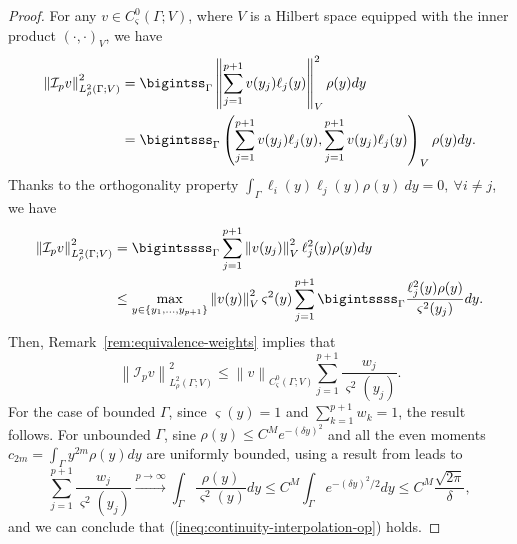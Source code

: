\documentclass[final,onefignum,onetabnum]{mousaviart}
\begin{document}
			\vspace*{1mm}
			\begin{proof}
				For any $v \in C^0_\varsigma\left( \Gamma; V \right)$, where $V$ is a Hilbert space equipped with the inner product $(\cdot, \cdot)_V$, we have
				\begin{align*}
					\left\| \mathcal{I}_p v\right\|_{L_\rho^2(\Gamma; V)}^2 
					&= 
					\bigintss_{\Gamma} \left\| \sum_{j=1}^{p+1} v(y_j) \ell_j(y) \right\|_V^2 \rho(y)dy 
					\\ 
					&=
					\bigintsss_{\Gamma} \left( \sum_{j=1}^{p+1} v(y_j) \ell_j(y), \sum_{j=1}^{p+1} v(y_j) \ell_j(y) \right)_V \rho(y)dy. 
				\end{align*}
				Thanks to the orthogonality property 
				$\int_{\Gamma}\ell_i(y)\ell_j(y)\rho(y)~dy = 0,~ \forall i\neq j$, we have
				\begin{align*}
					\left\| \mathcal{I}_p v\right\|_{L_\rho^2(\Gamma; V)}^2 
					&= 
					\bigintssss_{\Gamma} \sum_{j=1}^{p+1} \left\| v(y_j)\right\|_V^2  \ell_j^2(y) \rho(y)dy
					\\
					&\leq
					\max_{y \in \left\lbrace y_1, \dots, y_{p+1} \right\rbrace} 
					\left\| v(y)\right\|_V^2 \varsigma^2(y)
					\sum_{j=1}^{p+1} \bigintssss_{\Gamma} \frac{\ell_j^2(y) \rho(y)}{\varsigma^2(y_j)}dy.
				\end{align*}
				Then, Remark~\ref{rem:equivalence-weights} implies that
				\begin{equation*}
					\left\| \mathcal{I}_p v\right\|_{L_\rho^2(\Gamma; V)}^2 
					\leq
					\left\| v \right\|_{C_\varsigma^0(\Gamma; V)}
					\sum_{j=1}^{p+1} \dfrac{w_j}{\varsigma^2(y_j)}. 
				\end{equation*}
				For the case of bounded $\Gamma$, since $\varsigma(y)=1$ and $\sum_{k=1}^{p+1} w_k = 1$, the result follows. For unbounded $\Gamma$, sine $\rho(y) \leq  C^M e^{-(\delta y)^2}$ and all the even moments $c_{2m} = \int_{\Gamma}y^{2m} \rho(y)dy$ are uniformly bounded, using a result from \cite{Uspensky} leads to
				\begin{equation*}
					\sum_{j=1}^{p+1} \dfrac{w_j}{\varsigma^2(y_j)}
					\xrightarrow[]{p\rightarrow \infty}
					\int_{\Gamma}\frac{\rho(y)}{\varsigma^2(y)}
					dy \leq 
					C^M \int_{\Gamma} e^{-(\delta y)^2/2}dy
					\leq 
					C^M \frac{\sqrt{2 \pi}}{\delta},
				\end{equation*} 
				and we can conclude that (\ref{ineq:continuity-interpolation-op}) holds.
			\end{proof}
			
\end{document}
